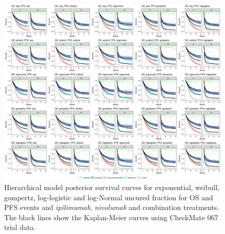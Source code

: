 \documentclass[AMA,STIX1COL]{WileyNJD-v2}
\begin{document}
\begin{figure}
\centering
\includegraphics[width=0.9\linewidth]{plot_S_grid_cf_hier.png}
\caption{\label{fig:S_grid_cf_hier} Hierarchical model posterior survival curves for exponential, weibull, gompertz, log-logistic and log-Normal uncured fraction for OS and PFS events and {\it ipilimumab}, {\it nivolumab} and combination treatments. The black lines show the Kaplan-Meier curves using CheckMate 067 trial data.}
\end{figure}


\end{document}
